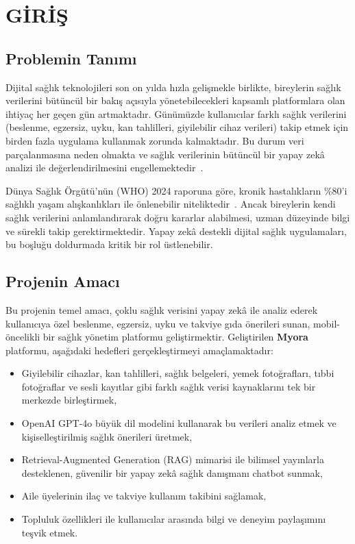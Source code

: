 \section{GİRİŞ}
\label{sec:giris}

\subsection{Problemin Tanımı}

Dijital sağlık teknolojileri son on yılda hızla gelişmekle birlikte, bireylerin sağlık verilerini bütüncül bir bakış açısıyla yönetebilecekleri kapsamlı platformlara olan ihtiyaç her geçen gün artmaktadır. Günümüzde kullanıcılar farklı sağlık verilerini (beslenme, egzersiz, uyku, kan tahlilleri, giyilebilir cihaz verileri) takip etmek için birden fazla uygulama kullanmak zorunda kalmaktadır. Bu durum veri parçalanmasına neden olmakta ve sağlık verilerinin bütüncül bir yapay zekâ analizi ile değerlendirilmesini engellemektedir~\cite{mHealth2023}.

Dünya Sağlık Örgütü'nün (WHO) 2024 raporuna göre, kronik hastalıkların \%80'i sağlıklı yaşam alışkanlıkları ile önlenebilir niteliktedir~\cite{WHO2024}. Ancak bireylerin kendi sağlık verilerini anlamlandırarak doğru kararlar alabilmesi, uzman düzeyinde bilgi ve sürekli takip gerektirmektedir. Yapay zekâ destekli dijital sağlık uygulamaları, bu boşluğu doldurmada kritik bir rol üstlenebilir.

\subsection{Projenin Amacı}

Bu projenin temel amacı, çoklu sağlık verisini yapay zekâ ile analiz ederek kullanıcıya özel beslenme, egzersiz, uyku ve takviye gıda önerileri sunan, mobil-öncelikli bir sağlık yönetim platformu geliştirmektir. Geliştirilen \textbf{Myora} platformu, aşağıdaki hedefleri gerçekleştirmeyi amaçlamaktadır:

\begin{itemize}
    \item Giyilebilir cihazlar, kan tahlilleri, sağlık belgeleri, yemek fotoğrafları, tıbbi fotoğraflar ve sesli kayıtlar gibi farklı sağlık verisi kaynaklarını tek bir merkezde birleştirmek,
    \item OpenAI GPT-4o büyük dil modelini kullanarak bu verileri analiz etmek ve kişiselleştirilmiş sağlık önerileri üretmek,
    \item Retrieval-Augmented Generation (RAG) mimarisi ile bilimsel yayınlarla desteklenen, güvenilir bir yapay zekâ sağlık danışmanı chatbot sunmak,
    \item Aile üyelerinin ilaç ve takviye kullanım takibini sağlamak,
    \item Topluluk özellikleri ile kullanıcılar arasında bilgi ve deneyim paylaşımını teşvik etmek.
\end{itemize}


